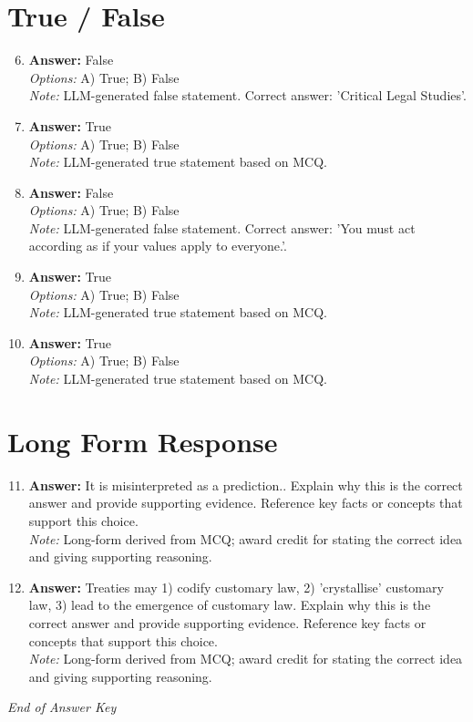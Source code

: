 \documentclass[12pt]{article}
\begin{document}
\section*{True / False}
\begin{enumerate}[label=\arabic*.]
\setcounter{enumi}{5}
\item \textbf{Answer:} False
\\ \textit{Options:} A) True; B) False
\\ \textit{Note:} LLM-generated false statement. Correct answer: 'Critical Legal Studies'.
\item \textbf{Answer:} True
\\ \textit{Options:} A) True; B) False
\\ \textit{Note:} LLM-generated true statement based on MCQ.
\item \textbf{Answer:} False
\\ \textit{Options:} A) True; B) False
\\ \textit{Note:} LLM-generated false statement. Correct answer: 'You must act according as if your values apply to everyone.'.
\item \textbf{Answer:} True
\\ \textit{Options:} A) True; B) False
\\ \textit{Note:} LLM-generated true statement based on MCQ.
\item \textbf{Answer:} True
\\ \textit{Options:} A) True; B) False
\\ \textit{Note:} LLM-generated true statement based on MCQ.
\end{enumerate}

\section*{Long Form Response}
\begin{enumerate}[label=\arabic*.]
\setcounter{enumi}{10}
\item \textbf{Answer:} It is misinterpreted as a prediction.. Explain why this is the correct answer and provide supporting evidence. Reference key facts or concepts that support this choice.
\\ \textit{Note:} Long-form derived from MCQ; award credit for stating the correct idea and giving supporting reasoning.
\item \textbf{Answer:} Treaties may 1) codify customary law, 2) 'crystallise' customary law, 3) lead to the emergence of customary law. Explain why this is the correct answer and provide supporting evidence. Reference key facts or concepts that support this choice.
\\ \textit{Note:} Long-form derived from MCQ; award credit for stating the correct idea and giving supporting reasoning.
\end{enumerate}

\vfill
\noindent\textit{End of Answer Key}
\end{document}
